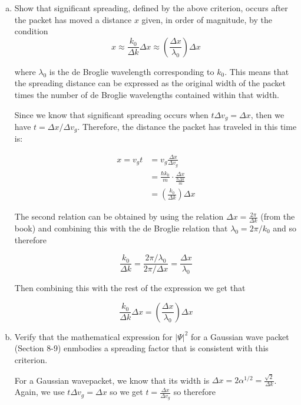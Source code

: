 \documentclass[10pt]{article}
\begin{document}
    \begin{enumerate}[(a)]
        \item Show that significant spreading, defined by the above criterion, occurs after the packet has moved a distance $x$ given, in order of magnitude, by the condition
        \[ x \approx \frac{k_0}{\Delta k}\Delta x \approx \left( \frac{\Delta x}{\lambda_0}\right) \Delta x\]

        where $\lambda_0$ is the de Broglie wavelength corresponding to $k_0$. This means that the spreading distance can be expressed as the original width of the packet times the number of de Broglie wavelengths contained within that width. 

        \begin{solution}
            Since we know that significant spreading occurs when $t\Delta v_g = \Delta x$, then we have $t = \Delta x/\Delta v_g$. Therefore, the distance the packet has traveled in this time is: 

            \begin{align*}
                x = v_g t &= v_g \frac{\Delta x}{\Delta v_g}\\
                &= \frac{\hbar k_0}{m} \cdot \frac{\Delta x}{\frac{\hbar \Delta k}{m}}\\
                &= \left( \frac{k_0}{\Delta k}\right) \Delta x
            \end{align*}

            The second relation can be obtained by using the relation $\Delta x = \frac{2\pi}{\Delta k}$ (from the book) and combining this with the de Broglie relation that $\lambda_0 = 2\pi/k_0$ and so therefore 

            \[ \frac{k_0}{\Delta k} = \frac{2\pi/\lambda_0}{2\pi/\Delta x} = \frac{\Delta x}{\lambda_0}\] 

            Then combining this with the rest of the expression we get that 

            \[ \frac{k_0}{\Delta k}\Delta x = \left( \frac{\Delta x}{\lambda_0}\right) \Delta x\]
        \end{solution}

        \item Verify that the mathematical expression for $|\Psi|^2$ for a Gaussian wave packet (Section 8-9) enmbodies a spreading factor that is consistent with this criterion. 
        
        \begin{solution}
            For a Gaussian wavepacket, we know that its width is $\Delta x = 2\alpha^{1/2} = \frac{\sqrt{2}}{\Delta k}$. Again, we use $t \Delta v_g = \Delta x$ so we get $t = \frac{\Delta x}{\Delta v_g}$ so therefore


\end{solution}
\end{enumerate}
\end{document}
